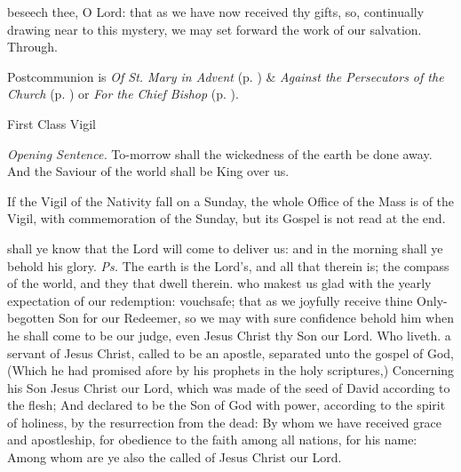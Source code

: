 \postcommunion
{} beseech thee, O Lord: that as we have now received thy gifts, so, continually drawing near to this mystery, we may set forward the work of our salvation. Through.
\begin{rubric}
     Postcommunion is \emph{Of St. Mary in Advent} (p. \pageref{SPMaryInAdvent}) \&  \emph{Against the Persecutors of the Church} (p. \pageref{SPAgainst}) or \emph{For the Chief Bishop} (p. \pageref{SPChiefBishop}).
\end{rubric}

\begin{inhead}
{First Class Vigil}
\end{inhead}
\par\noindent
\textit{Opening Sentence.} To-morrow shall the wickedness of the earth be done away. And the Saviour of the world shall be King over us.\par

\begin{rubric}
    If the Vigil of the Nativity fall on a Sunday, the whole Office of the Mass is of the Vigil, with commemoration of the Sunday, but its Gospel is not read at the end.
\end{rubric}

\introit
{} shall ye know that the Lord will come to deliver us: and in the morning shall ye behold his glory. \textit{Ps.} The earth is the Lord's, and all that therein is; the compass of the world, and they that dwell therein.
\collect
{} who makest us glad with the yearly expectation of our redemption: vouchsafe; that as we joyfully receive thine Only-begotten Son for our Redeemer, so we may with sure confidence behold him when he shall come to be our judge, even Jesus Christ thy Son our Lord. Who liveth.
 a servant of Jesus Christ, called to be an apostle, separated unto the gospel of God, (Which he had promised afore by his prophets in the holy scriptures,) Concerning his Son Jesus Christ our Lord, which was made of the seed of David according to the flesh; And declared to be the Son of God with power, according to the spirit of holiness, by the resurrection from the dead: By whom we have received grace and apostleship, for obedience to the faith among all nations, for his name: Among whom are ye also the called of Jesus Christ our Lord.

